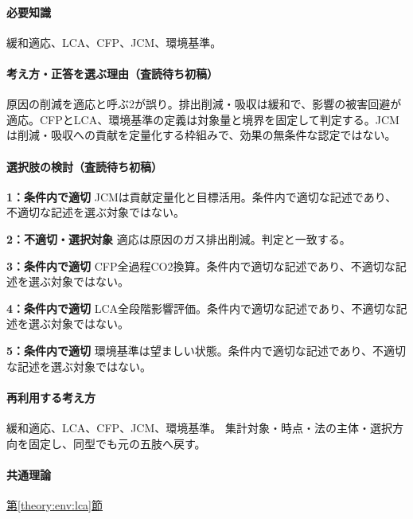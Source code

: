 \paragraph{必要知識} 緩和適応、LCA、CFP、JCM、環境基準。

\paragraph{考え方・正答を選ぶ理由（査読待ち初稿）} 原因の削減を適応と呼ぶ2が誤り。排出削減・吸収は緩和で、影響の被害回避が適応。CFPとLCA、環境基準の定義は対象量と境界を固定して判定する。JCMは削減・吸収への貢献を定量化する枠組みで、効果の無条件な認定ではない。

\paragraph{選択肢の検討（査読待ち初稿）}\mbox{}\par

\noindent\textbf{1：条件内で適切} JCMは貢献定量化と目標活用。条件内で適切な記述であり、不適切な記述を選ぶ対象ではない。\par

\noindent\textbf{2：不適切・選択対象} 適応は原因のガス排出削減。判定と一致する。\par

\noindent\textbf{3：条件内で適切} CFP全過程CO2換算。条件内で適切な記述であり、不適切な記述を選ぶ対象ではない。\par

\noindent\textbf{4：条件内で適切} LCA全段階影響評価。条件内で適切な記述であり、不適切な記述を選ぶ対象ではない。\par

\noindent\textbf{5：条件内で適切} 環境基準は望ましい状態。条件内で適切な記述であり、不適切な記述を選ぶ対象ではない。\par

\paragraph{再利用する考え方} 緩和適応、LCA、CFP、JCM、環境基準。 集計対象・時点・法の主体・選択方向を固定し、同型でも元の五肢へ戻す。

\paragraph{共通理論} \hyperref[theory:env:lca]{第\ref*{theory:env:lca}節}

